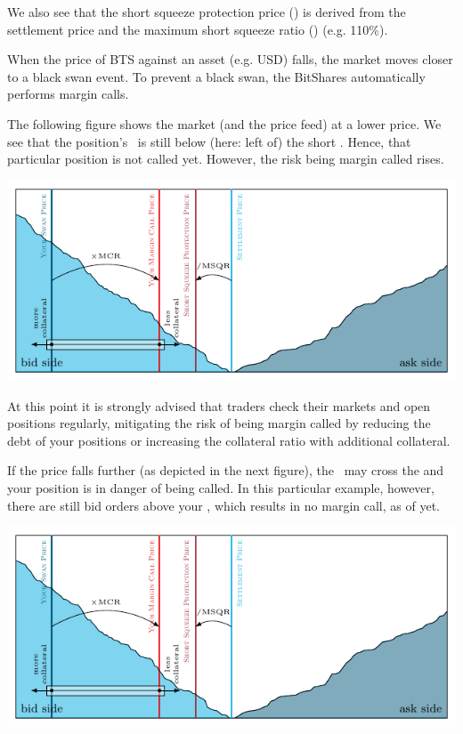 We also see that the short squeeze protection price (\SQP) is derived from the
settlement price and the maximum short squeeze ratio (\MSQR) (e.g. 110\%).

\bigskip

When the price of BTS against an asset (e.g. USD) falls, the market moves
closer to a black swan event. To prevent a black swan, the BitShares
automatically performs margin calls.

The following figure shows the market (and the price feed) at a lower price. We
see that the position's \MCP\ is still below (here: left of) the short \SQP.
Hence, that particular position is not called yet. However, the risk being
margin called rises.

\includegraphics[width=.9\linewidth,page=2]{figures/dex-engine-def.pdf}

At this point it is strongly advised that traders check their markets and open
positions regularly, mitigating the risk of being margin called by reducing the
debt of your positions or increasing the collateral ratio with additional
collateral.

If the price falls further (as depicted in the next figure), the \SQP\ may
cross the \MCP and your position is in danger of being called. In this
particular example, however, there are still bid orders above your \MCP, which
results in no margin call, as of yet.

\includegraphics[width=.9\linewidth,page=3]{figures/dex-engine-def.pdf}

